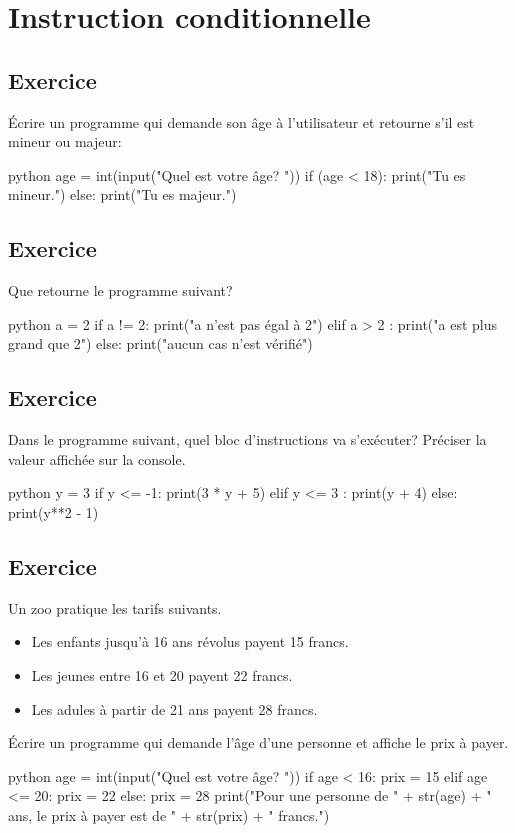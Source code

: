 \documentclass[a4paper,11pt]{article}
\begin{document}
\section{Instruction conditionnelle}

\subsection{Exercice}
Écrire un programme qui demande son âge à l'utilisateur et retourne s'il est mineur ou majeur:\\
\begin{solution}
\begin{code}[interactive]{python}
age = int(input("Quel est votre âge? "))
if (age < 18):
  print("Tu es mineur.")
else:
  print("Tu es majeur.")
\end{code}
\end{solution}

\subsection{Exercice}
Que retourne le programme suivant?
\begin{code}[interactive]{python}
a = 2
if a != 2:
    print("a n'est pas égal à 2")
elif a > 2 :
    print("a est plus grand que 2")
else:
    print("aucun cas n'est vérifié")
\end{code}

\subsection{Exercice}
Dans le programme suivant, quel bloc d'instructions va s'exécuter? Préciser la valeur affichée sur la console.
\begin{code}[interactive]{python}
y = 3
if y <= -1:
    print(3 * y + 5)
elif y <= 3 :
    print(y + 4)
else:
    print(y**2 - 1)
\end{code}

\subsection{Exercice}
Un zoo pratique les tarifs suivants.\\
\begin{itemize}
    \item Les enfants jusqu'à 16 ans révolus payent 15 francs.
    \item Les jeunes entre 16 et 20 payent 22 francs.
    \item Les adules à partir de 21 ans payent 28 francs.
\end{itemize}
Écrire un programme qui demande l'âge d'une personne et affiche le prix à payer.
\begin{solution}
\begin{code}[interactive]{python}
age = int(input("Quel est votre âge? "))
if age < 16:
    prix = 15
elif age <= 20:
    prix = 22
else:
    prix = 28
print("Pour une personne de " + str(age) + " ans, le prix à payer est de " + str(prix) + " francs.")
\end{code}
\end{solution}
\end{document}
